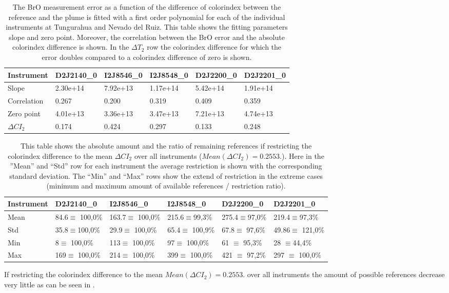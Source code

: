 	\begin{table}[h]
	\begin{tabular}{|p{2cm}|p{2cm}|p{2cm}|p{2cm}|p{2cm}|p{2cm}|}
		Instrument	&D2J2140\_0&I2J8546\_0& I2J8548\_0&D2J2200\_0&D2J2201\_0\\
		\toprule
		Slope&2.30e+14 &7.92e+13 &1.17e+14 &5.42e+14&1.91e+14\\
		\midrule
		Correlation&
		0.267&
		0.200&
		0.319&
		0.409&
		0.359\\
		\midrule
		Zero point&4.01e+13&3.36e+13&3.47e+13& 7.21e+13& 4.74e+13\\
		\midrule
		$\Delta CI_{2}$&0.174&0.424&0.297&0.133&0.248\\
		\bottomrule
	\end{tabular}
	\caption{The BrO measurement error as a function of the difference of colorindex between the reference and the plume is fitted with a first order polynomial for each of the individual instruments at Tungurahua and Nevado del Ruiz. This table shows the fitting parameters slope and zero point. Moreover, the correlation between the BrO error and the absolute colorindex difference is shown. In the $\Delta T_{2}$ row the colorindex difference for which the error doubles compared to a colorindex difference of zero is shown.}
	\label{tab:colidxcalc}
\end{table}

	\begin{table}[h]
	\begin{tabular}{|p{2cm}|p{2cm}|p{2cm}|p{2cm}|p{2cm}|p{2cm}|}
		Instrument	&D2J2140\_0&I2J8546\_0& I2J8548\_0&D2J2200\_0&D2J2201\_0\\
		\toprule
		Mean&
		84.6$\equiv$ 100,0\% &	163.7$\equiv$ 100,0\%&	215.6$\equiv$99,3\%&
		275.4$\equiv$97,0\% &219.4$\equiv$97,3\% \\
		\midrule
		Std&
		35.8$\equiv$100,0\% &	29.9$\equiv$	100,0\% &
		65.4$\equiv$	100,9\%&
		67.8$\equiv$	97,6\% &
		49.86$\equiv$	121,0\% \\
		\midrule
		Min&
		8$\equiv$	100,0\% &
		113$\equiv$	100,0\% 
		&97$\equiv$	100,0\% 
		&61 $\equiv$	95,3\% 
		&28	$\equiv$44,4\% \\
		\midrule
		Max
		&169$\equiv$	100,0\% 
		&214$\equiv$	100,0\% 
		&399$\equiv$	100,0\% 
		&421 $\equiv$	97,2\% 
		&297 $\equiv$	100,0\%  \\
		\bottomrule
	\end{tabular}
	\caption{This table shows the absolute amount and the ratio of remaining references if restricting the colorindex difference to the mean $\Delta CI_{2}$ over all instruments ($Mean(\Delta CI_{2}) = 0.2553.$). Here in the ”Mean” and “Std” row for each  instrument the average restriction is shown with the corresponding standard deviation. The “Min” and “Max” rows show the extend of restriction in the extreme cases (minimum and maximum amount of available references / restriction ratio).}
	\label{tab:colidxres}
\end{table}	
If restricting the colorindex difference to the mean $Mean(\Delta CI_{2}) = 0.2553.$ over all instruments the amount of possible references decrease very little as can be seen in .\\


